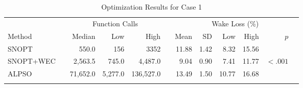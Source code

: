 \documentclass[a4paper]{jpconf}
\begin{document}
%
\begin{table}
\caption{Optimization Results for Case 1}
\label{tab:case1}
\centering
\begin{tabular}{lcrrrcrrrrrr}
	\br
	& & \multicolumn{3}{c}{Function Calls} &  & \multicolumn{6}{c}{\quad \quad \quad \quad \quad Wake Loss (\%) \quad \quad \quad \quad \quad} \\
	\cline{3-5}\cline{7-12}
	Method  & & Median & Low & High & & Mean & SD & Low & High & $p$ \\
	\cline{1-1}\cline{3-5}\cline{7-12}
	SNOPT  & & 550.0 & 156 & 3352 & & 11.88 & 1.42 & 8.32 & 15.56 &   \\
	SNOPT+WEC & & 2,563.5 & 745.0 & 4,487.0 &  &  9.04 & 0.90 & 7.41 & 11.77 & $<.001$\\
	ALPSO & & 71,652.0 & 5,277.0 & 136,527.0 & & 13.49 & 1.50 & 10.77 & 16.68 & \\
	\br
\end{tabular}
\end{table}
%
\end{document}
